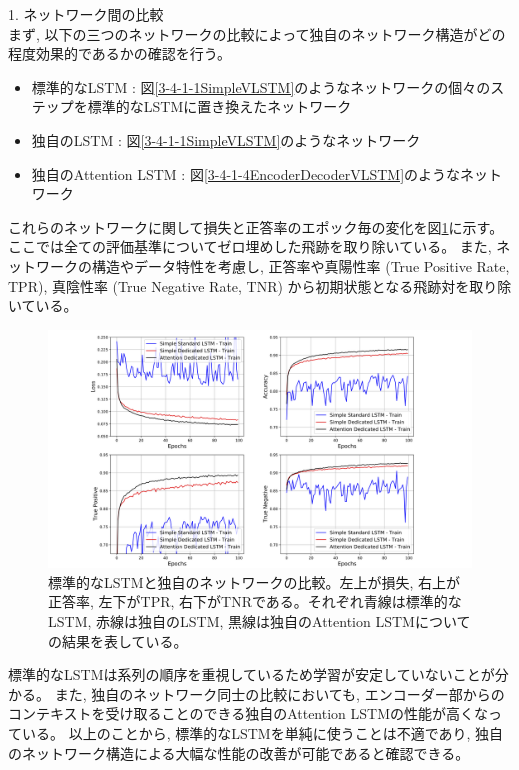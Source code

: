 1. ネットワーク間の比較\\

まず, 以下の三つのネットワークの比較によって独自のネットワーク構造がどの程度効果的であるかの確認を行う。

\begin{itemize}
 \item 標準的なLSTM : 図\ref{3-4-1-1SimpleVLSTM}のようなネットワークの個々のステップを標準的なLSTMに置き換えたネットワーク
 \item 独自のLSTM : 図\ref{3-4-1-1SimpleVLSTM}のようなネットワーク
 \item 独自のAttention LSTM : 図\ref{3-4-1-4EncoderDecoderVLSTM}のようなネットワーク
\end{itemize}

これらのネットワークに関して損失と正答率のエポック毎の変化を図\ref{3-4-3-1LSTMvsVLSTM}に示す。
ここでは全ての評価基準についてゼロ埋めした飛跡を取り除いている。
また, ネットワークの構造やデータ特性を考慮し, 正答率や真陽性率 (True Positive Rate, TPR), 真陰性率 (True Negative Rate, TNR) から初期状態となる飛跡対を取り除いている。

\begin{figure}[htbp]
 \centering
 \includegraphics[trim = 100 0 100 0, width=1.0\textwidth, clip]{Figure/3Networks/3-4-3-1LSTMvsVLSTM.png}
 \caption[標準的なLSTMと独自のネットワークの比較]{標準的なLSTMと独自のネットワークの比較。左上が損失, 右上が正答率, 左下がTPR, 右下がTNRである。それぞれ青線は標準的なLSTM, 赤線は独自のLSTM, 黒線は独自のAttention LSTMについての結果を表している。}
 \label{3-4-3-1LSTMvsVLSTM}
\end{figure}

標準的なLSTMは系列の順序を重視しているため学習が安定していないことが分かる。
また, 独自のネットワーク同士の比較においても, エンコーダー部からのコンテキストを受け取ることのできる独自のAttention LSTMの性能が高くなっている。
以上のことから, 標準的なLSTMを単純に使うことは不適であり, 独自のネットワーク構造による大幅な性能の改善が可能であると確認できる。\\

